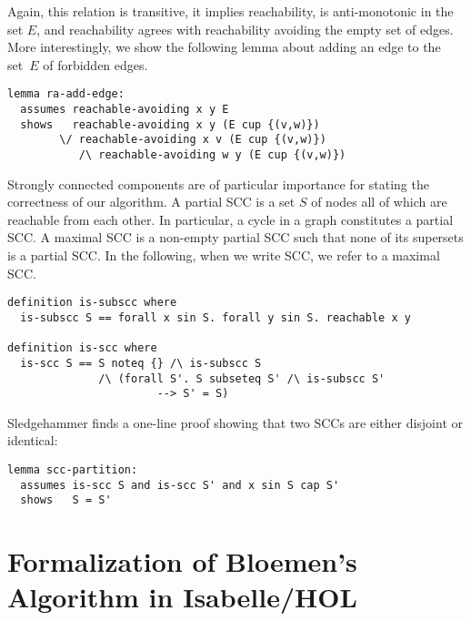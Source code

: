\documentclass[sigplan,10pt,anonymous,review]{acmart}
\begin{document}
Again, this relation is transitive, it implies reachability, is anti-monotonic in the set $E$, and reachability agrees with reachability avoiding the empty set of edges. More interestingly, we show the following lemma about adding an edge to the set~$E$ of forbidden edges.

\begin{small}
\begin{lstlisting}[language=isabelle]
lemma ra-add-edge:
  assumes reachable-avoiding x y E
  shows   reachable-avoiding x y (E cup {(v,w)})
        \/ reachable-avoiding x v (E cup {(v,w)})
           /\ reachable-avoiding w y (E cup {(v,w)})
\end{lstlisting}
\end{small}

Strongly connected components are of particular importance for stating the correctness of our algorithm. A partial SCC is a set $S$ of nodes all of which are reachable from each other. In particular, a cycle in a graph constitutes a partial SCC. A maximal SCC is a non-empty partial SCC such that none of its supersets is a partial SCC. In the following, when we write SCC, we refer to a maximal SCC.

\begin{small}
\begin{lstlisting}[language=isabelle]
definition is-subscc where
  is-subscc S == forall x sin S. forall y sin S. reachable x y

definition is-scc where
  is-scc S == S noteq {} /\ is-subscc S
              /\ (forall S'. S subseteq S' /\ is-subscc S'
                       --> S' = S)
\end{lstlisting}
\end{small}

Sledgehammer finds a one-line proof showing that two SCCs are either disjoint or identical:

\begin{small}
\begin{lstlisting}[language=isabelle]
lemma scc-partition:
  assumes is-scc S and is-scc S' and x sin S cap S'
  shows   S = S'
\end{lstlisting}
\end{small}


\section{Formalization of Bloemen's Algorithm in Isabelle/HOL}
\label{sec:formalization}
\end{document}
